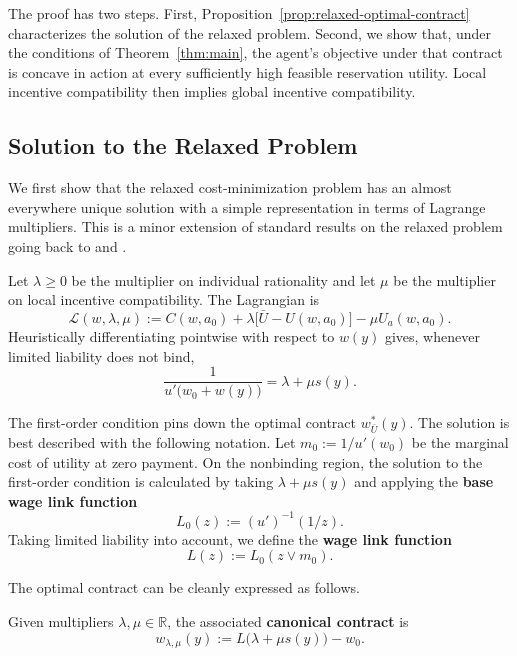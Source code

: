 The proof has two steps.  First, Proposition~\ref{prop:relaxed-optimal-contract} characterizes the solution of the relaxed
problem.  Second, we show that, under the conditions of Theorem~\ref{thm:main},
the agent's objective under that contract is concave in action at every
sufficiently high feasible reservation utility.  Local incentive compatibility
then implies global incentive compatibility.

\subsection{Solution to the Relaxed Problem}

We first show that the relaxed cost-minimization problem has an almost
everywhere unique solution with a simple representation in terms of Lagrange
multipliers.  This is a minor extension of standard results on the relaxed
problem going back to \textcite{holmstrom1978incentives} and
\textcite{jewitt2008moral}.

Let $\lambda\geq0$ be the multiplier on individual rationality and let $\mu$ be
the multiplier on local incentive compatibility.  The Lagrangian is
\begin{equation}
    \mathcal L(w,\lambda,\mu)
    :=C(w,a_0)+\lambda\bigl[\bar U-U(w,a_0)\bigr]
      -\mu U_a(w,a_0).
    \label{eq:lagrangian}
\end{equation}
Heuristically differentiating pointwise with respect to $w(y)$
gives, whenever limited liability does not
bind,
\begin{equation}
    \frac{1}{u'\bigl(w_0+w(y)\bigr)}=\lambda+\mu s(y).
    \tag{FOC}\label{eq:foc}
\end{equation}

The first-order condition pins down the optimal contract $w^*_{\bar U}(y)$.
The solution is best described with the following notation.  Let
$m_0:=1/u'(w_0)$ be the marginal cost of utility at zero payment.  On the
nonbinding region, the solution to the first-order condition is calculated by taking $\lambda + \mu s(y)$ and applying the \textbf{base wage link function}
\[
    L_0(z):=(u')^{-1}(1/z).
\]
Taking limited liability into account, we define the \textbf{wage link function}
\[
    L(z):=L_0(z\vee m_0).
\]

The optimal contract can be cleanly expressed as follows.

\begin{definition}
\label{def:canonical-contract}
Given multipliers $\lambda,\mu\in\mathbb R$, the associated \textbf{canonical contract} is
\begin{equation}
    w_{\lambda,\mu}(y):=L\bigl(\lambda+\mu s(y)\bigr)-w_0.
    \label{eq:canonical-contract}
\end{equation}
\end{definition}

